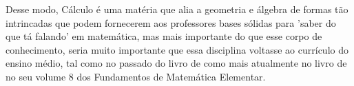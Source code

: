\documentclass[
	12pt,				%
	openright,			%
	oneside,
	a4paper,			%
	chapter=TITLE,		%
	section=TITLE,		%
	sumario=abnt-6027-2012,
	english,			%
	brazil				%
]{abntex2}
\newcommand{\ImprimirSimOuNao}[2][Sim]
{
  \ifthenelse{\equal{#1}{Sim}}{#2}{}
}
\begin{document}
	Desse modo, Cálculo é uma matéria que alia a geometria e álgebra de formas tão intrincadas que podem fornecerem aos professores bases sólidas para 'saber do que tá falando' em matemática, mas mais importante do que esse corpo de conhecimento, seria muito importante que essa disciplina voltasse ao currículo do ensino médio, tal como no passado do livro de  como mais atualmente no livro de  no seu volume 8 dos Fundamentos de Matemática Elementar.





\label{oculto:bibliografia}








\postextual



	\ImprimirSimOuNao[Não]{             %
		\glossary
	}



\end{document}
